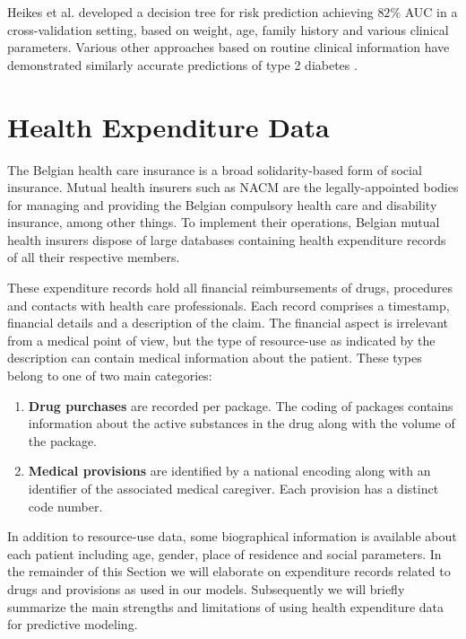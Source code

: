 Heikes et al. \citep{heikes2008diabetes} developed a decision tree for risk prediction achieving $82\%$ AUC in a cross-validation setting, based on weight, age, family history and various clinical parameters. Various other approaches based on routine clinical information have demonstrated similarly accurate predictions of type 2 diabetes \citep{stern2002identification, mcneely2003comparison}.


%
%

\section{Health Expenditure Data}
The Belgian health care insurance is a broad solidarity-based form of social insurance. Mutual health insurers such as NACM are the legally-appointed bodies for managing and providing the Belgian compulsory health care and disability insurance, among other things. To implement their operations, Belgian mutual health insurers dispose of large databases containing health expenditure records of all their respective members. 

These expenditure records hold all financial reimbursements of drugs, procedures and contacts with health care professionals. Each record comprises a timestamp, financial details and a description of the claim. The financial aspect is irrelevant from a medical point of view, but the type of resource-use as indicated by the description can contain medical information about the patient. These types belong to one of two main categories:
\begin{enumerate}
\item \textbf{Drug purchases} are recorded per package. The coding of packages contains information about the active substances in the drug along with the volume of the package.
\item \textbf{Medical provisions} are identified by a national encoding along with an identifier of the associated medical caregiver. Each provision has a distinct code number.
\end{enumerate}

In addition to resource-use data, some biographical information is available about each patient including age, gender, place of residence and social parameters. In the remainder of this Section we will elaborate on expenditure records related to drugs and provisions as used in our models. Subsequently we will briefly summarize the main strengths and limitations of using health expenditure data for predictive modeling.

